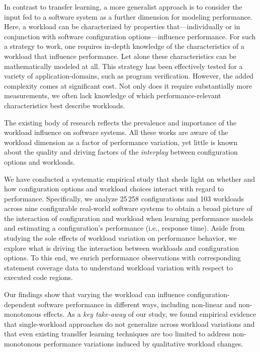 In contrast to transfer learning, a more generalist approach is to consider the input fed to a software system as a further dimension for modeling performance. Here, a workload can be characterized by properties that---individually or in conjunction with software configuration options---influence performance. For such a strategy to work, one requires in-depth knowledge of the characteristics of a workload that influence performance. Let alone these characteristics can be mathematically modeled at all. This strategy has been effectively tested for a  variety of application-domains, such as program verification. However, the added complexity comes at significant cost. 
Not only does it require substantially more measurements, we often lack knowledge of which performance-relevant characteristics best describe workloads.


The existing body of research reflects the prevalence and importance of the workload influence on software systems. All these works are aware of the workload dimension as a factor of performance variation, yet little is known about the quality and driving factors of the \emph{interplay} between configuration options and workloads. 

We have conducted a systematic empirical study that sheds light on whether and how configuration options and workload choices interact with regard to performance. 
Specifically, we analyze 25\,258 configurations and 103 workloads across nine configurable real-world software systems to obtain a broad picture of the interaction of configuration and workload when learning performance models and estimating a configuration's performance (i.e., response time). Aside from studying the sole effects of workload variation on performance behavior, we explore what is driving the interaction between workloads and configuration options. To this end, we enrich performance observations with corresponding statement coverage data to understand workload variation with respect to executed code regions.

{\color{edited}Our findings show that varying the workload can influence con\-fi\-gu\-ra\-tion-de\-pen\-dent software performance in different ways, including non-linear and non-monotonous effects. 
As a \textit{key take-away} of our study, we found empirical evidence that single-workload approaches do not generalize across workload variations and that even existing translfer learning techniques are too limited to address non-monotonous performance variations induced by qualitative workload changes. 
}

